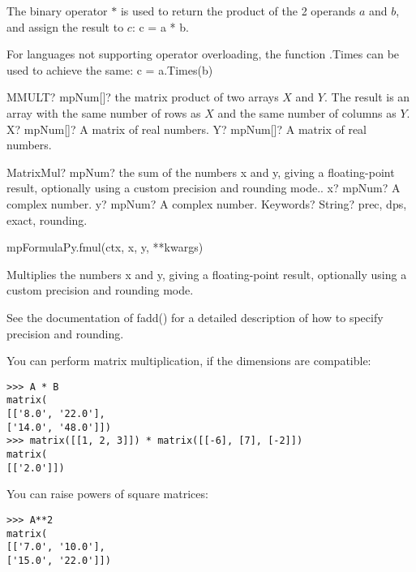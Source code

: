 \vspace{0.3cm}
The binary operator $*$ is used to return the product of the 2 operands $a$ and $b$, and assign the result to $c$: \textsf{c = a * b}.

For languages not supporting operator overloading, the function \textsf{.Times} can be used to achieve the same: \textsf{c = a.Times(b)}


\begin{mpFunctionsExtract}
	\mpWorksheetFunctionTwoNotImplemented
	{MMULT? mpNum[]? the matrix product of two arrays $X$ and $Y$. The result is an array with the same number of rows as $X$ and the same number of columns as $Y$.}
	{X? mpNum[]? A matrix of real numbers.}
	{Y? mpNum[]? A matrix of real numbers.}
\end{mpFunctionsExtract}




\vspace{0.3cm}
\begin{mpFunctionsExtract}
	\mpFunctionThree
	{MatrixMul? mpNum? the sum of the numbers x and y, giving a floating-point result, optionally using a custom precision and rounding mode..}
	{x? mpNum? A complex number.}
	{y? mpNum? A complex number.}
	{Keywords? String? prec, dps, exact, rounding.}	
\end{mpFunctionsExtract}


mpFormulaPy.fmul(ctx, x, y, **kwargs)

\vpara
Multiplies the numbers x and y, giving a floating-point result, optionally using a custom precision and rounding mode.

\vpara
See the documentation of fadd() for a detailed description of how to specify precision and rounding.




You can perform matrix multiplication, if the dimensions are compatible:

\begin{lstlisting}
>>> A * B
matrix(
[['8.0', '22.0'],
['14.0', '48.0']])
>>> matrix([[1, 2, 3]]) * matrix([[-6], [7], [-2]])
matrix(
[['2.0']])
\end{lstlisting}

You can raise powers of square matrices:

\begin{lstlisting}
>>> A**2
matrix(
[['7.0', '10.0'],
['15.0', '22.0']])
\end{lstlisting}


















